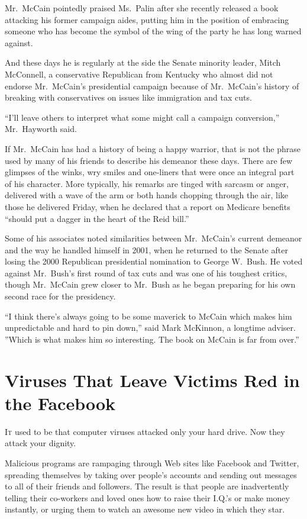 ﻿\documentclass[12pt]{article}
\begin{document}
Mr.~McCain pointedly praised Ms.~Palin after she recently released a book attacking his former
campaign aides, putting him in the position of embracing someone who has become the symbol of the
wing of the party he has long warned against.

And these days he is regularly at the side the Senate minority leader, Mitch McConnell, a
conservative Republican from Kentucky who almost did not endorse Mr.~McCain's presidential campaign
because of Mr.~McCain's history of breaking with conservatives on issues like immigration and tax
cuts.

``I'll leave others to interpret what some might call a campaign conversion,'' Mr.~Hayworth said.

If Mr.~McCain has had a history of being a happy warrior, that is not the phrase used by many of his
friends to describe his demeanor these days. There are few glimpses of the winks, wry smiles and
one-liners that were once an integral part of his character. More typically, his remarks are tinged
with sarcasm or anger, delivered with a wave of the arm or both hands chopping through the air, like
those he delivered Friday, when he declared that a report on Medicare benefits ``should put a dagger
in the heart of the Reid bill.''

Some of his associates noted similarities between Mr.~McCain's current demeanor and the way he
handled himself in 2001, when he returned to the Senate after losing the 2000 Republican
presidential nomination to George W.~Bush. He voted against Mr.~Bush's first round of tax cuts and
was one of his toughest critics, though Mr.~McCain grew closer to Mr.~Bush as he began preparing for
his own second race for the presidency.

``I think there's always going to be some maverick to McCain which makes him unpredictable and hard
to pin down,'' said Mark McKinnon, a longtime adviser. ''Which is what makes him so interesting. The
book on McCain is far from over.''

\section{Viruses That Leave Victims Red in the Facebook}

\lettrine{I}{t} used to be that computer viruses attacked only your hard
drive. Now they attack your dignity.

Malicious programs are rampaging through Web sites like Facebook and Twitter, spreading themselves
by taking over people's accounts and sending out messages to all of their friends and followers. The
result is that people are inadvertently telling their co-workers and loved ones how to raise their
I.Q.'s or make money instantly, or urging them to watch an awesome new video in which they star.
\end{document}
